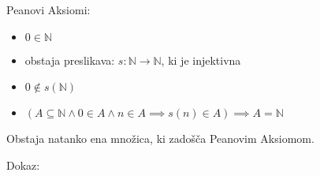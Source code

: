 \begin{definicija}
    Peanovi Aksiomi:
    \begin{itemize}
        \item $0 \in \mathbb{N}$
        \item obstaja preslikava: $s: \mathbb{N} \to \mathbb{N}$, ki je injektivna
        \item $0 \notin s(\mathbb{N})$
        \item $(A \subseteq \mathbb{N} \wedge 0 \in A \wedge n \in A \implies s(n) \in A) \implies A = \mathbb{N}$
    \end{itemize}
\end{definicija}

\begin{trditev}
    Obstaja natanko ena množica, ki zadošča Peanovim Aksiomom.
\end{trditev}
Dokaz:

